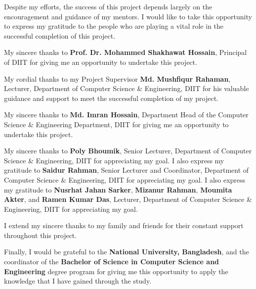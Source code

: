 Despite my efforts, the success of this project depends largely on the encouragement and guidance of my mentors. I would like to take this opportunity to express my gratitude to the people who are playing a vital role in the successful completion of this project.

\vspace{1em}

My sincere thanks to \textbf{Prof. Dr. Mohammed Shakhawat Hossain}, Principal of DIIT for giving me an opportunity to undertake this project.

\vspace{1em}

My cordial thanks to my Project Supervisor \textbf{Md. Mushfiqur Rahaman}, Lecturer, Department of Computer Science \& Engineering, DIIT for his valuable guidance and support to meet the successful completion of my project.

\vspace{1em}

My sincere thanks to \textbf{Md. Imran Hossain}, Department Head of the Computer Science \& Engineering Department, DIIT for giving me an opportunity to undertake this project. 

\vspace{1em}

My sincere thanks to \textbf{Poly Bhoumik}, Senior Lecturer, Department of Computer Science \& Engineering, DIIT for appreciating my goal. I also express my gratitude to \textbf{Saidur Rahman}, Senior Lecturer and Coordinator, Department of Computer Science \& Engineering, DIIT for appreciating my goal. I also express my gratitude to \textbf{Nusrhat Jahan Sarker}, \textbf{Mizanur Rahman}, \textbf{Moumita Akter}, and \textbf{Ramen Kumar Das}, Lecturer, Department of Computer Science \& Engineering, DIIT for appreciating my goal.

\vspace{1em}

I extend my sincere thanks to my family and friends for their constant support throughout this project. 

\vspace{1em}

Finally, I would be grateful to the \textbf{National University, Bangladesh}, and the coordinator of the \textbf{Bachelor of Science in Computer Science and Engineering} degree program for giving me this opportunity to apply the knowledge that I have gained through the study.
